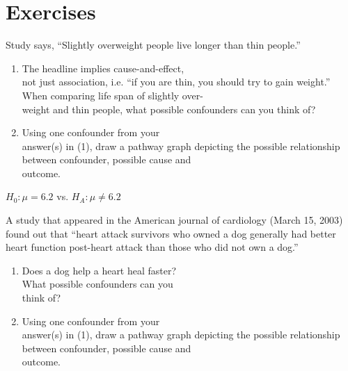 \documentclass[11pt, chapterprefix=true]{scrbook}\usepackage[]{graphicx}\usepackage[]{color}
\begin{document}
\twocolumn
\section{Exercises}

\begin{exercises}

%
%
  \begin{exercise} %

Study says, ``Slightly overweight people live longer than thin people.''

\begin{enumerate}
  \item The headline implies cause-and-effect, \\ not just association, i.e. ``if you are thin, you should try to gain weight.''  When comparing life span of slightly over- \\ weight and thin people, what possible confounders can you think of?
  \item Using one confounder from your \\ answer(s) in (1), draw a pathway graph depicting the possible relationship between confounder, possible cause and \\ outcome.
\end{enumerate}

	\end{exercise}
	\begin{solution}  %

	  $H_0: \mu = 6.2$ vs. $H_A: \mu \neq 6.2$
	\end{solution}

  \begin{exercise} %

A study that appeared in the American journal of cardiology (March 15, 2003) found out that ``heart attack survivors who owned a dog generally had better heart function post-heart attack than those who did not own a dog.''

\begin{enumerate}
  \item Does a dog help a heart heal faster?  \\ What possible confounders can you \\ think of?
  \item Using one confounder from your \\ answer(s) in (1), draw a pathway graph depicting the possible relationship between confounder, possible cause and \\ outcome.
\end{enumerate}


\end{exercise}
\end{exercises}
\end{document}
